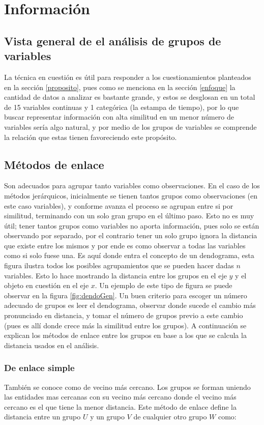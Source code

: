 \documentclass[journal, 10pt]{IEEEtran}                                                          %
\begin{document}
\section{Información}\label{informacion}
\subsection{Vista general de el análisis de grupos de variables}\label{overview}
La técnica en cuestión es útil para responder a los cuestionamientos planteados en la sección \ref{proposito}, pues como se menciona en la sección \ref{enfoque} la cantidad de datos a analizar es bastante grande, y estos se desglosan en un total de 15 variables continuas y 1 categórica (la estampa de tiempo), por lo que buscar representar información con alta similitud en un menor número de variables sería algo natural, y por medio de los grupos de variables se comprende la relación que estas tienen favoreciendo este propósito. 

\subsection{Métodos de enlace}

Son adecuados para agrupar tanto variables como observaciones. En el caso de los métodos jerárquicos, inicialmente se tienen tantos grupos como observaciones (en este caso variables), y conforme avanza el proceso se agrupan entre si por similitud, terminando con un solo gran grupo en el último paso. Esto no es muy útil; tener tantos grupos como variables no aporta información, pues solo se están observando por separado, por el contrario tener un solo grupo ignora la distancia que existe entre los mismos y por ende es como observar a todas las variables como si solo fuese una. Es aquí donde entra el concepto de un dendograma, esta figura ilustra todos los posibles agrupamientos que se pueden hacer dadas $n$ variables. Esto lo hace mostrando la distancia entre los grupos en el eje $y$ y el objeto en cuestión en el eje $x$. Un ejemplo de este tipo de figura se puede observar en la figura \ref{fig:dendoGen}. Un buen criterio para escoger un número adecuado de grupos es leer el dendograma, observar donde sucede el cambio más pronunciado en distancia, y tomar el número de grupos previo a este cambio (pues es allí donde crece más la similitud entre los grupos). A continuación se explican los métodos de enlace entre los grupos en base a los que se calcula la distancia usados en el análisis. 

\subsubsection{De enlace simple}\label{simple}
También se conoce como de vecino más cercano. Los grupos se forman uniendo las entidades mas cercanas con su vecino más cercano donde el vecino más cercano es el que tiene la menor distancia. Este método de enlace define la distancia entre un grupo $U$ y un grupo $V$ de cualquier otro grupo $W$ como:
\end{document}
